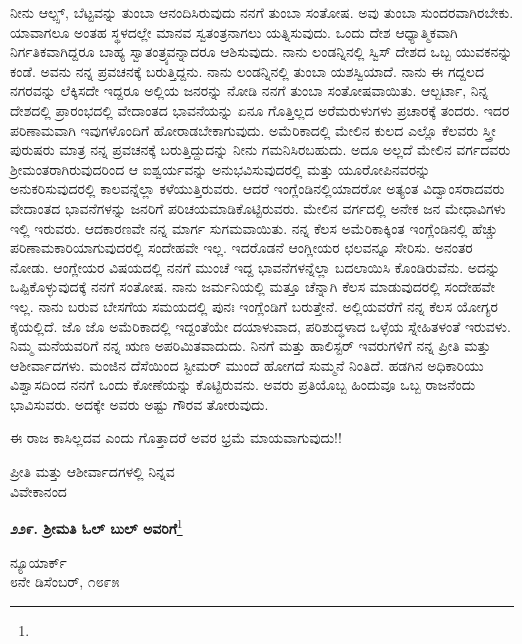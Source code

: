 ನೀನು ಆಲ್ಪ್ಸ್, ಬೆಟ್ಟವನ್ನು ತುಂಬಾ ಆನಂದಿಸಿರುವುದು ನನಗೆ ತುಂಬಾ ಸಂತೋಷ. ಅವು ತುಂಬಾ ಸುಂದರವಾಗಿರಬೇಕು. ಯಾವಾಗಲೂ ಅಂತಹ ಸ್ಥಳದಲ್ಲೇ ಮಾನವ ಸ್ವತಂತ್ರನಾಗಲು ಯತ್ನಿಸುವುದು. ಒಂದು ದೇಶ ಆಧ್ಯಾತ್ಮಿಕವಾಗಿ ನಿರ್ಗತಿಕವಾಗಿದ್ದರೂ ಬಾಹ್ಯ ಸ್ವಾತಂತ್ರ್ಯವನ್ನಾದರೂ ಆಶಿಸುವುದು. ನಾನು ಲಂಡನ್ನಿನಲ್ಲಿ ಸ್ವಿಸ್ ದೇಶದ ಒಬ್ಬ ಯುವಕನನ್ನು ಕಂಡೆ. ಅವನು ನನ್ನ ಪ್ರವಚನಕ್ಕೆ ಬರುತ್ತಿದ್ದನು. ನಾನು ಲಂಡನ್ನಿನಲ್ಲಿ ತುಂಬಾ ಯಶಸ್ವಿಯಾದೆ. ನಾನು ಈ ಗದ್ದಲದ ನಗರವನ್ನು ಲೆಕ್ಕಿಸದೇ ಇದ್ದರೂ ಅಲ್ಲಿಯ ಜನರನ್ನು ನೋಡಿ ನನಗೆ ತುಂಬಾ ಸಂತೋಷವಾಯಿತು. ಆಲ್ಬರ್ಟಾ, ನಿನ್ನ ದೇಶದಲ್ಲಿ ಪ್ರಾರಂಭದಲ್ಲಿ ವೇದಾಂತದ ಭಾವನೆಯನ್ನು ಏನೂ ಗೊತ್ತಿಲ್ಲದ ಅರೆಮರುಳುಗಳು ಪ್ರಚಾರಕ್ಕೆ ತಂದರು. ಇದರ ಪರಿಣಾಮವಾಗಿ ಇವುಗಳೊಂದಿಗೆ ಹೋರಾಡಬೇಕಾಗುವುದು. ಅಮೆರಿಕಾದಲ್ಲಿ ಮೇಲಿನ ಕುಲದ ಎಲ್ಲೊ ಕೆಲವರು ಸ್ತ್ರೀ ಪುರುಷರು ಮಾತ್ರ ನನ್ನ ಪ್ರವಚನಕ್ಕೆ ಬರುತ್ತಿದ್ದುದನ್ನು ನೀನು ಗಮನಿಸಿರಬಹುದು. ಅದೂ ಅಲ್ಲದೆ ಮೇಲಿನ ವರ್ಗದವರು ಶ‍್ರೀಮಂತರಾಗಿರುವುದರಿಂದ ಆ ಐಶ್ವರ್ಯವನ್ನು ಅನುಭವಿಸುವುದರಲ್ಲಿ ಮತ್ತು ಯೂರೋಪಿನವರನ್ನು ಅನುಕರಿಸುವುದರಲ್ಲಿ ಕಾಲವನ್ನೆಲ್ಲಾ ಕಳೆಯುತ್ತಿರುವರು. ಆದರೆ ಇಂಗ್ಲೆಂಡಿನಲ್ಲಿಯಾದರೋ ಅತ್ಯಂತ ವಿದ್ವಾಂಸರಾದವರು ವೇದಾಂತದ ಭಾವನೆಗಳನ್ನು ಜನರಿಗೆ ಪರಿಚಯಮಾಡಿಕೊಟ್ಟಿರುವರು. ಮೇಲಿನ ವರ್ಗದಲ್ಲಿ ಅನೇಕ ಜನ ಮೇಧಾವಿಗಳು ಇಲ್ಲಿ ಇರುವರು. ಆದಕಾರಣವೇ ನನ್ನ ಮಾರ್ಗ ಸುಗಮವಾಯಿತು. ನನ್ನ ಕೆಲಸ ಅಮೆರಿಕಾಕ್ಕಿಂತ ಇಂಗ್ಲೆಂಡಿನಲ್ಲಿ ಹೆಚ್ಚು ಪರಿಣಾಮಕಾರಿಯಾಗುವುದರಲ್ಲಿ ಸಂದೇಹವೇ ಇಲ್ಲ. ಇದರೊಡನೆ ಆಂಗ್ಲೀಯರ ಛಲವನ್ನೂ ಸೇರಿಸು. ಅನಂತರ ನೋಡು. ಆಂಗ್ಲೇಯರ ವಿಷಯದಲ್ಲಿ ನನಗೆ ಮುಂಚೆ ಇದ್ದ ಭಾವನೆಗಳನ್ನೆಲ್ಲಾ ಬದಲಾಯಿಸಿ ಕೊಂಡಿರುವೆನು. ಅದನ್ನು ಒಪ್ಪಿಕೊಳ್ಳುವುದಕ್ಕೆ ನನಗೆ ಸಂತೋಷ. ನಾನು ಜರ್ಮನಿಯಲ್ಲಿ ಮತ್ತೂ ಚೆನ್ನಾಗಿ ಕೆಲಸ ಮಾಡುವುದರಲ್ಲಿ ಸಂದೇಹವೇ ಇಲ್ಲ. ನಾನು ಬರುವ ಬೇಸಗೆಯ ಸಮಯದಲ್ಲಿ ಪುನಃ ಇಂಗ್ಲೆಂಡಿಗೆ ಬರುತ್ತೇನೆ. ಅಲ್ಲಿಯವರೆಗೆ ನನ್ನ ಕೆಲಸ ಯೋಗ್ಯರ ಕೈಯಲ್ಲಿದೆ. ಜೊ ಜೊ ಅಮೆರಿಕಾದಲ್ಲಿ ಇದ್ದಂತೆಯೇ ದಯಾಳುವಾದ, ಪರಿಶುದ್ಧಳಾದ ಒಳ್ಳೆಯ ಸ್ನೇಹಿತಳಂತೆ ಇರುವಳು. ನಿಮ್ಮ ಮನೆಯವರಿಗೆ ನನ್ನ ಋಣ ಅಪರಿಮಿತವಾದುದು. ನಿನಗೆ ಮತ್ತು ಹಾಲಿಸ್ಟರ್ ಇವರುಗಳಿಗೆ ನನ್ನ ಪ್ರೀತಿ ಮತ್ತು ಆಶೀರ್ವಾದಗಳು. ಮಂಜಿನ ದೆಸೆಯಿಂದ ಸ್ಟೀಮರ್ ಮುಂದೆ ಹೋಗದೆ ಸುಮ್ಮನೆ ನಿಂತಿದೆ. ಹಡಗಿನ ಅಧಿಕಾರಿಯು ವಿಶ್ವಾಸದಿಂದ ನನಗೆ ಒಂದು ಕೋಣೆಯನ್ನು ಕೊಟ್ಟಿರುವನು. ಅವರು ಪ್ರತಿಯೊಬ್ಬ ಹಿಂದುವೂ ಒಬ್ಬ ರಾಜನೆಂದು ಭಾವಿಸುವರು. ಅದಕ್ಕೇ ಅವರು ಅಷ್ಟು ಗೌರವ ತೋರುವುದು.

ಈ ರಾಜ ಕಾಸಿಲ್ಲದವ ಎಂದು ಗೊತ್ತಾದರೆ ಅವರ ಭ್ರಮೆ ಮಾಯವಾಗುವುದು!!
\vspace{-0.2cm}

{\flushright
ಪ್ರೀತಿ ಮತ್ತು ಆಶೀರ್ವಾದಗಳಲ್ಲಿ ನಿನ್ನವ\\ವಿವೇಕಾನಂದ\par}
\vspace{-0.2cm}

\begin{center}
\textbf{೨೨೯. ಶ‍್ರೀಮತಿ ಓಲ್ ಬುಲ್ ಅವರಿಗೆ}\footnote{}
\end{center}
\vspace{-0.4cm}

\begin{flushright}
ನ್ಯೂಯಾರ್ಕ್\\೮ನೇ ಡಿಸೆಂಬರ್, ೧೮೯೫
\end{flushright}
\vspace{-0.2cm}

